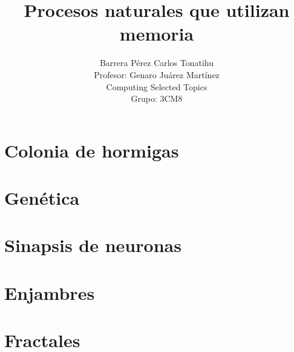 \documentclass[a4paper,12pt]{article}
\title{Procesos naturales que utilizan memoria}
\author{Barrera Pérez Carlos Tonatihu \\ Profesor: Genaro Juárez Martínez \\ Computing Selected Topics \\ Grupo: 3CM8 }
\begin{document}
\maketitle

\newpage
\section{Colonia de hormigas}
\section{Genética}
\section{Sinapsis de neuronas}
\section{Enjambres}
\section{Fractales}
\end{document}
